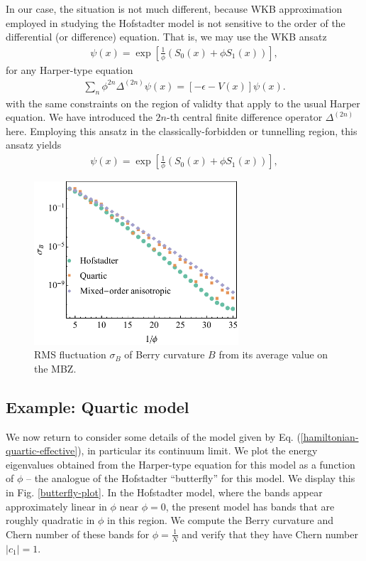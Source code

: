\documentclass[aps,prb,twocolumn,letterpaper,twoside,nobalancelastpage,groupedaddress,amsmath,amssymb,floatfix,citeautoscript]{revtex4-1}
\begin{document}
In our case, the situation is not much different, because WKB approximation employed in studying the Hofstadter model is not sensitive to the order of the differential (or difference) equation. That is, we may use the WKB ansatz
\begin{align}
\label{wkb-ansatz}
\psi(x) = \exp\left[\frac{1}{\phi}\left(S_0(x) + \phi S_1(x)\right)\right],
\end{align}
for any Harper-type equation
\begin{align*}
\sum_{n}\phi^{2n}\Delta^{(2n)}\psi(x) = \left[-\epsilon - V(x)\right]\psi(x).
\end{align*}
with the same constraints on the region of validty that apply to the usual Harper equation. We have introduced the $2n$-th central finite difference operator $\Delta^{(2n)}$ here. Employing this ansatz in the classically-forbidden or tunnelling region, this ansatz yields
\begin{align}
\label{wkb-solution}
\psi(x) = \exp\left[\frac{1}{\phi}\left(S_0(x) + \phi S_1(x)\right)\right],
\end{align}

\begin{figure}[thb]
\centering
\includegraphics[width=3.0in]{rms-curv-fluct.pdf}
\caption{RMS fluctuation $\sigma_B$ of Berry curvature $B$ from its average value on the MBZ.}
\end{figure}

\subsection{Example: Quartic model}
We now return to consider some details of the model given by Eq. (\ref{hamiltonian-quartic-effective}), in particular its continuum limit. We plot the energy eigenvalues obtained from the Harper-type equation for this model as a function of $\phi$ -- the analogue of the Hofstadter ``butterfly'' for this model\cite{hofstadter_energy_1976}. We display this in Fig. \ref{butterfly-plot}. In the Hofstadter model, where the bands appear approximately linear in $\phi$ near $\phi = 0$, the present model has bands that are roughly quadratic in $\phi$ in this region. We compute the Berry curvature and Chern number of these bands for $\phi = \frac{1}{N}$ and verify that they have Chern number $|c_1| = 1$.
\end{document}
